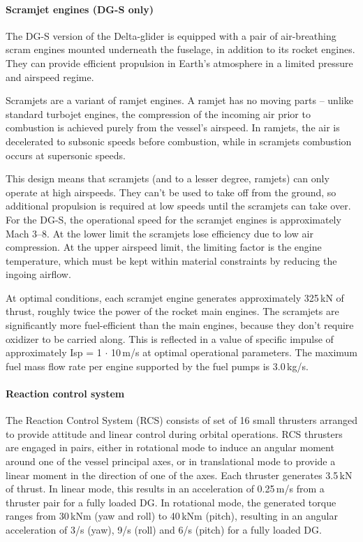 \documentclass[Orbiter User Manual.tex]{subfiles}
\begin{document}
\paragraph{Scramjet engines (DG-S only)}
The DG-S version of the Delta-glider is equipped with a pair of air-breathing
scram engines mounted underneath the fuselage, in addition to its rocket
engines. They can provide efficient propulsion in Earth's atmosphere in a
limited pressure and airspeed regime.

Scramjets are a variant of ramjet engines. A ramjet has no moving parts --
unlike standard turbojet engines, the compression of the incoming air prior to
combustion is achieved purely from the vessel's airspeed. In ramjets, the air is
decelerated to subsonic speeds before combustion, while in scramjets combustion
occurs at supersonic speeds.

This design means that scramjets (and to a lesser degree, ramjets) can only
operate at high airspeeds. They can't be used to take off from the ground, so
additional propulsion is required at low speeds until the scramjets can take
over. For the DG-S, the operational speed for the scramjet engines is
approximately Mach 3--8. At the lower limit the scramjets lose efficiency due to
low air compression. At the upper airspeed limit, the limiting factor is the
engine temperature, which must be kept within material constraints by reducing
the ingoing airflow.

At optimal conditions, each scramjet engine generates approximately 325\,kN of
thrust, roughly twice the power of the rocket main engines. The scramjets are
significantly more fuel-efficient than the main engines, because they don't
require oxidizer to be carried along. This is reflected in a value of specific
impulse of approximately Isp = 1 $\cdot$ 10\,m/s at optimal
operational parameters. The maximum fuel mass flow rate per engine supported by
the fuel pumps is 3.0\,kg/s.

\paragraph{Reaction control system}
The Reaction Control System (RCS) consists of set of 16 small thrusters arranged
to provide attitude and linear control during orbital operations. RCS thrusters
are engaged in pairs, either in rotational mode to induce an angular moment
around one of the vessel principal axes, or in translational mode to provide a
linear moment in the direction of one of the axes. Each thruster generates
3.5\,kN of thrust. In linear mode, this results in an acceleration of
0.25\,m/s from a thruster pair for a fully loaded DG. In rotational
mode, the generated torque ranges from 30\,kNm (yaw and roll) to 40\,kNm
(pitch), resulting in an angular acceleration of 3\deg/s (yaw),
9\deg/s (roll) and 6\deg/s (pitch) for a fully loaded DG.
\end{document}
